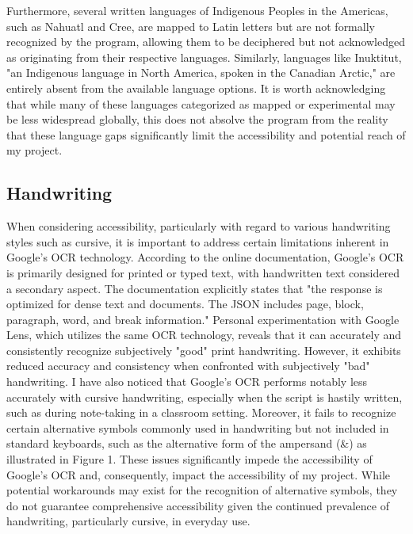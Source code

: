 \documentclass[10pt,twocolumn]{article}
\begin{document}
Furthermore, several written languages of Indigenous Peoples in the Americas, such as Nahuatl and Cree, are mapped to Latin letters but are not formally recognized by the program, allowing them to be deciphered but not acknowledged as originating from their respective languages. Similarly, languages like Inuktitut, "an Indigenous language in North America, spoken in the Canadian Arctic,"\cite{inuit} are entirely absent from the available language options. It is worth acknowledging that while many of these languages categorized as mapped or experimental may be less widespread globally, this does not absolve the program from the reality that these language gaps significantly limit the accessibility and potential reach of my project.

\subsection{Handwriting}

When considering accessibility, particularly with regard to various handwriting styles such as cursive, it is important to address certain limitations inherent in Google's OCR technology. According to the online documentation, Google's OCR is primarily designed for printed or typed text, with handwritten text considered a secondary aspect. The documentation explicitly states that "the response is optimized for dense text and documents. The JSON includes page, block, paragraph, word, and break information."\cite{handwritingOCR} Personal experimentation with Google Lens, which utilizes the same OCR technology, reveals that it can accurately and consistently recognize subjectively "good" print handwriting. However, it exhibits reduced accuracy and consistency when confronted with subjectively "bad" handwriting. I have also noticed that Google's OCR performs notably less accurately with cursive handwriting, especially when the script is hastily written, such as during note-taking in a classroom setting. Moreover, it fails to recognize certain alternative symbols commonly used in handwriting but not included in standard keyboards, such as the alternative form of the ampersand (\&) as illustrated in Figure 1. These issues significantly impede the accessibility of Google's OCR and, consequently, impact the accessibility of my project. While potential workarounds may exist for the recognition of alternative symbols, they do not guarantee comprehensive accessibility given the continued prevalence of handwriting, particularly cursive, in everyday use. 
\end{document}
